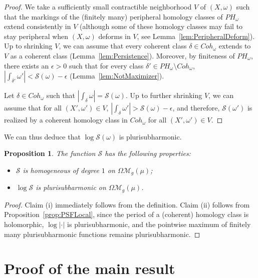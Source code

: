 \documentclass[11]{amsart}
\theoremstyle{plain}
\newtheorem{proposition}[theorem]{Proposition}
\theoremstyle{definition}
\begin{document}
\begin{proof}
We take a sufficiently small contractible neighborhood $V$ of $(X,\omega)$ such that the markings of the (finitely many) peripheral homology classes of $PH_{\omega}$ extend consistently in $V$ (although some of these homology classes may fail to stay peripheral when $(X,\omega)$ deforms in $V$, see Lemma~\ref{lem:PeripheralDeform}). Up to shrinking $V$, we can assume that every coherent class $\delta \in Coh_{\omega}$ extends to $V$ as a coherent class (Lemma~\ref{lem:Persistence}). Moreover, by finiteness of $PH_{\omega}$, there exists an $\epsilon>0$ such that for every class $\delta' \in PH_{\omega} \setminus Coh_{\omega}$, $|\int_{\delta'} \omega'|<\mathcal{S}(\omega)-\epsilon$ (Lemma~\ref{lem:NotMaximizer}).
\par
Let $\delta \in Coh_{\omega}$ such that $|\int_{\delta} \omega|=\mathcal{S}(\omega)$. Up to further shrinking $V$, we can assume that for all $(X',\omega')\in V$, $|\int_{\delta} \omega'|>\mathcal{S}(\omega)-\epsilon$, and therefore, $\mathcal{S}(\omega')$ is realized by a coherent homology class in $Coh_{\omega}$ for all $(X',\omega') \in V$. 
\end{proof}

We can thus deduce that $\log \mathcal{S}(\omega)$ is plurisubharmonic. 

\begin{proposition}\label{lem:functionS}
The function $\mathcal{S}$ has the following properties:
\begin{itemize}
\item[(i)] $\mathcal{S}$ is homogeneous of degree $1$ on $\Omega\mathcal M_g(\mu)$;
\item[(ii)] $\log \mathcal{S}$ is plurisubharmonic on $\Omega\mathcal M_g(\mu)$.
\end{itemize} 
\end{proposition}

\begin{proof}
Claim (i) immediately follows from the definition. Claim (ii) follows from Proposition~\ref{prop:PSFLocal}, since the period of a (coherent) homology class is holomorphic, $\log |\cdot|$ is plurisubharmonic, and the pointwise maximum of finitely many plurisubharmonic functions remains plurisubharmonic. 
\end{proof}


\section{Proof of the main result}\label{sec:Main}
\end{document}
